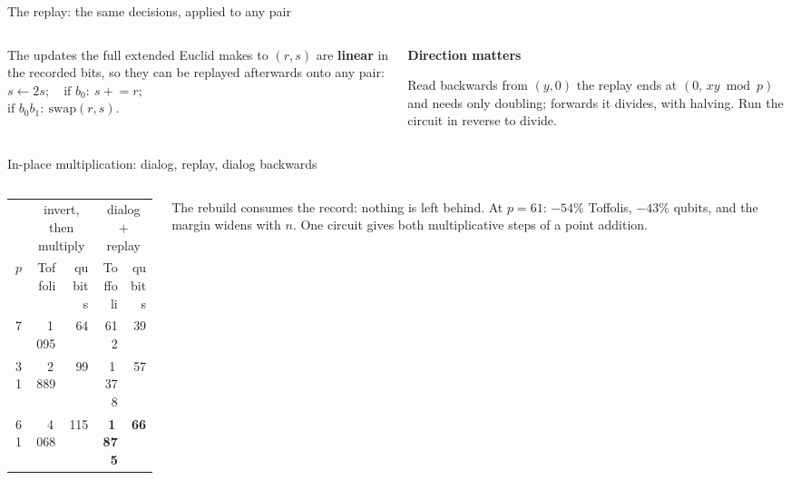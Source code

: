 \documentclass[aspectratio=169,11pt]{beamer}
\newcommand{\peachtitle}[1]{{\bfseries\color{cverm}#1}\par\vskip1mm}
\newcommand{\code}[2][]{}
\begin{document}
\setcounter{framenumber}{89}
\begin{frame}[fragile]{The replay: the same decisions, applied to any pair}
  \begin{columns}[T]
    \begin{column}{0.48\textwidth}
      \small The updates the full extended Euclid makes to $(r,s)$ are \textbf{linear} in the recorded bits, so they can be replayed afterwards onto any pair:
      \vskip1mm
      \centering$s\leftarrow2s;\quad \text{if } b_0:\ s\mathrel{+}=r;$\\[0.5mm]
      $\text{if } b_0b_1:\ \text{swap}(r,s).$
    \end{column}
    \begin{column}{0.48\textwidth}
      \begin{peachblock}[fontupper=\small]\peachtitle{Direction matters}
        Read backwards from $(y,0)$ the replay ends at $(0,\,xy\bmod p)$ and needs only doubling; forwards it divides, with halving. Run the circuit in reverse to divide.
      \end{peachblock}
    \end{column}
  \end{columns}
  \code[basicstyle=\ttfamily\scriptsize]{bezout_replay.py}
\end{frame}

\setcounter{framenumber}{90}
\begin{frame}[fragile]{In-place multiplication: dialog, replay, dialog backwards}
  \code[basicstyle=\ttfamily\fontsize{7.6}{8.8}\selectfont]{inplace_mul_short.py}
  \begin{columns}[T]
    \begin{column}{0.5\textwidth}
      \centering\footnotesize
      \renewcommand{\arraystretch}{1.08}
      \begin{tabular}{@{}rrrrr@{}}
        \toprule
        & \multicolumn{2}{c}{invert, then multiply} & \multicolumn{2}{c}{dialog $+$ replay} \\
        $p$ & Toffoli & qubits & Toffoli & qubits \\
        \midrule
        7 & 1\,095 & 64 & 612 & 39 \\
        31 & 2\,889 & 99 & 1\,378 & 57 \\
        61 & 4\,068 & 115 & \textbf{1\,875} & \textbf{66} \\
        \bottomrule
      \end{tabular}
    \end{column}
    \begin{column}{0.46\textwidth}
      \small The rebuild consumes the record: nothing is left behind. At $p=61$: $-54\%$ Toffolis, $-43\%$ qubits, and the margin widens with $n$. One circuit gives both multiplicative steps of a point addition.
    \end{column}
  \end{columns}
\end{frame}
\end{document}

